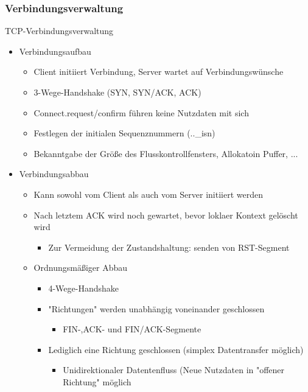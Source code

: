     \subsubsection{Verbindungsverwaltung}
      TCP-Verbindungsverwaltung
      \begin{itemize}
        \item Verbindungsaufbau
          \begin{itemize}
            \item Client initiiert Verbindung, Server wartet auf Verbindungswünsche
            \item 3-Wege-Handshake (SYN, SYN/ACK, ACK)
            \item Connect.request/confirm führen keine Nutzdaten mit sich
            \item Festlegen der initialen Sequenznummern (..\_isn)
            \item Bekanntgabe der Größe des Flusskontrollfensters, Allokatoin Puffer, ...
          \end{itemize}
        \item Verbindungsabbau
          \begin{itemize}
            \item Kann sowohl vom Client als auch vom Server initiiert werden
            \item Nach letztem ACK wird noch gewartet, bevor loklaer Kontext gelöscht wird
              \begin{itemize}
                \item Zur Vermeidung der Zustandshaltung: senden von RST-Segment
              \end{itemize}
            \item Ordnungsmäßiger Abbau
              \begin{itemize}
                \item 4-Wege-Handshake
                \item "Richtungen" werden unabhängig voneinander geschlossen
                  \begin{itemize}
                    \item FIN-,ACK- und FIN/ACK-Segmente
                  \end{itemize}
                \item Lediglich eine Richtung geschlossen (simplex Datentransfer möglich)
                  \begin{itemize}
                    \item Unidirektionaler Datentenfluss (Neue Nutzdaten in "offener Richtung" möglich

\end{itemize}
\end{itemize}
\end{itemize}
\end{itemize}

